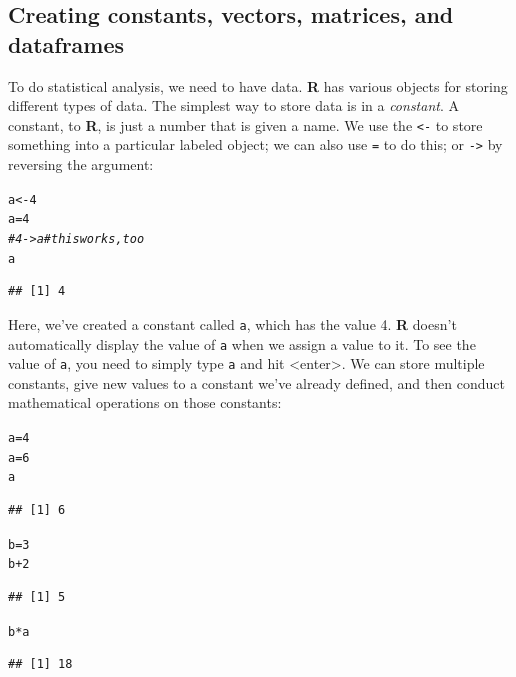 \documentclass[12pt]{article}\usepackage[]{graphicx}\usepackage[]{color}
\makeatletter
\newcommand{\hlnum}[1]{\textcolor[rgb]{0.686,0.059,0.569}{#1}}%
\newcommand{\hlcom}[1]{\textcolor[rgb]{0.678,0.584,0.686}{\textit{#1}}}%
\newcommand{\hlopt}[1]{\textcolor[rgb]{0,0,0}{#1}}%
\newcommand{\hlstd}[1]{\textcolor[rgb]{0.345,0.345,0.345}{#1}}%
\newcommand{\hlkwb}[1]{\textcolor[rgb]{0.69,0.353,0.396}{#1}}%
\newenvironment{kframe}{%
 \def\at@end@of@kframe{}%
 \ifinner\ifhmode%
  \def\at@end@of@kframe{\end{minipage}}%
  \begin{minipage}{\columnwidth}%
 \fi\fi%
 \def\FrameCommand##1{\hskip\@totalleftmargin \hskip-\fboxsep
 \colorbox{shadecolor}{##1}\hskip-\fboxsep
     \hskip-\linewidth \hskip-\@totalleftmargin \hskip\columnwidth}%
 \MakeFramed {\advance\hsize-\width
   \@totalleftmargin\z@ \linewidth\hsize
   \@setminipage}}%
 {\par\unskip\endMakeFramed%
 \at@end@of@kframe}
\newenvironment{knitrout}{}{} %
\makeatother
\begin{document}
\subsection{Creating constants, vectors, matrices, and dataframes}
To do statistical analysis, we need to have data. \textbf{R} has various objects for storing different types of data. The simplest way to store data is in a \emph{constant}. A constant, to \textbf{R}, is just a number that is given a name. We use the \verb|<-| to store something into a particular labeled object; we can also use \verb|=| to do this; or \verb|->| by reversing the argument:
\begin{knitrout}
\color{fgcolor}\begin{kframe}
\begin{alltt}
\hlstd{a} \hlkwb{<-} \hlnum{4}
\hlstd{a} \hlkwb{=} \hlnum{4}
\hlcom{# 4->a # this works, too}
\hlstd{a}
\end{alltt}
\begin{verbatim}
## [1] 4
\end{verbatim}
\end{kframe}
\end{knitrout}

Here, we've created a constant called \verb|a|, which has the value 4. \textbf{R} doesn't automatically display the value of \verb|a| when we assign a value to it. To see the value of \verb|a|, you need to simply type \verb|a| and hit <enter>. We can store multiple constants, give new values to a constant we've already defined, and then conduct mathematical operations on those constants:
\begin{knitrout}
\color{fgcolor}\begin{kframe}
\begin{alltt}
\hlstd{a} \hlkwb{=} \hlnum{4}
\hlstd{a} \hlkwb{=} \hlnum{6}
\hlstd{a}
\end{alltt}
\begin{verbatim}
## [1] 6
\end{verbatim}
\begin{alltt}
\hlstd{b} \hlkwb{=} \hlnum{3}
\hlstd{b} \hlopt{+} \hlnum{2}
\end{alltt}
\begin{verbatim}
## [1] 5
\end{verbatim}
\begin{alltt}
\hlstd{b} \hlopt{*} \hlstd{a}
\end{alltt}
\begin{verbatim}
## [1] 18
\end{verbatim}
\end{kframe}
\end{knitrout}
\end{document}
